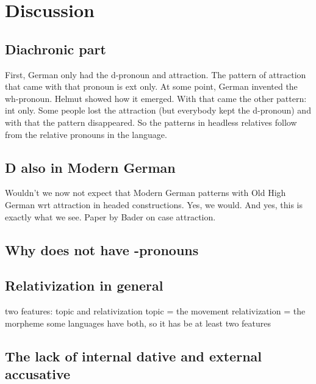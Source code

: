 
\chapter{Discussion}\label{ch:discussion}

\section{Diachronic part}

First, German only had the d-pronoun and attraction. The pattern of attraction that came with that pronoun is ext only.
At some point, German invented the wh-pronoun. Helmut showed how it emerged. With that came the other pattern: int only. Some people lost the attraction (but everybody kept the d-pronoun) and with that the pattern disappeared.
So the patterns in headless relatives follow from the relative pronouns in the language.

\section{D also in Modern German}

Wouldn't we now not expect that Modern German patterns with Old High German wrt attraction in headed constructions. Yes, we would. And yes, this is exactly what we see. Paper by Bader on case attraction.

\section{Why  does not have -pronouns}

\section{Relativization in general}

two features: topic and relativization
topic = the movement
relativization = the morpheme
some languages have both, so it has be at least two features


\section{The lack of internal dative and external accusative}
